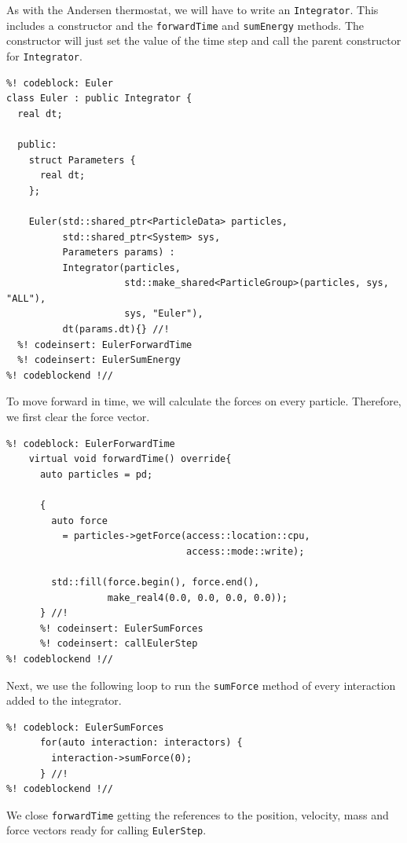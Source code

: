 As with the Andersen thermostat, we will have to write an \texttt{Integrator}. 
This includes a constructor and the \texttt{forwardTime} and \texttt{sumEnergy} 
methods. The constructor will just set the value of the time step and call the 
parent constructor for \texttt{Integrator}.
\begin{lstlisting}
%! codeblock: Euler
class Euler : public Integrator {
  real dt;

  public:
    struct Parameters {
      real dt;
    };

    Euler(std::shared_ptr<ParticleData> particles,
          std::shared_ptr<System> sys,
          Parameters params) :
          Integrator(particles,
                     std::make_shared<ParticleGroup>(particles, sys, "ALL"),
                     sys, "Euler"),
          dt(params.dt){} //!
  %! codeinsert: EulerForwardTime
  %! codeinsert: EulerSumEnergy
%! codeblockend !//
\end{lstlisting}
To move forward in time, we will calculate the forces on every particle. 
Therefore, we first clear the force vector.
\begin{lstlisting}
%! codeblock: EulerForwardTime
    virtual void forwardTime() override{
      auto particles = pd;

      {
        auto force
          = particles->getForce(access::location::cpu,
                                access::mode::write);

        std::fill(force.begin(), force.end(),
                  make_real4(0.0, 0.0, 0.0, 0.0));
      } //!
      %! codeinsert: EulerSumForces
      %! codeinsert: callEulerStep
%! codeblockend !//
\end{lstlisting}
Next, we use the following loop to run the \texttt{sumForce} method of every 
interaction added to the integrator.
\begin{lstlisting}
%! codeblock: EulerSumForces
      for(auto interaction: interactors) {
        interaction->sumForce(0);
      } //!
%! codeblockend !//
\end{lstlisting}
We close \texttt{forwardTime} getting the references to the position, velocity, 
mass and force vectors ready for calling \texttt{EulerStep}.
